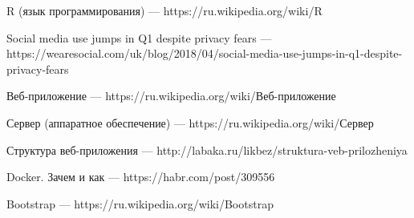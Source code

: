 \documentclass[14pt,a4paper]{scrartcl}
\begin{document}
    \newpage
    \begin{thebibliography}{9}
        R (язык программирования)
        \newblock --- https://ru.wikipedia.org/wiki/R

        Social media use jumps in Q1 despite privacy fears
        \newblock --- https://wearesocial.com/uk/blog/2018/04/social-media-use-jumps-in-q1-despite-privacy-fears

        Веб-приложение
        \newblock --- https://ru.wikipedia.org/wiki/Веб-приложение

        Сервер (аппаратное обеспечение)
        \newblock --- https://ru.wikipedia.org/wiki/Сервер

        Структура веб-приложения
        \newblock --- http://labaka.ru/likbez/struktura-veb-prilozheniya

        Docker. Зачем и как
        \newblock --- https://habr.com/post/309556

        Bootstrap
        \newblock --- https://ru.wikipedia.org/wiki/Bootstrap

    \end{thebibliography}
\end{document}
